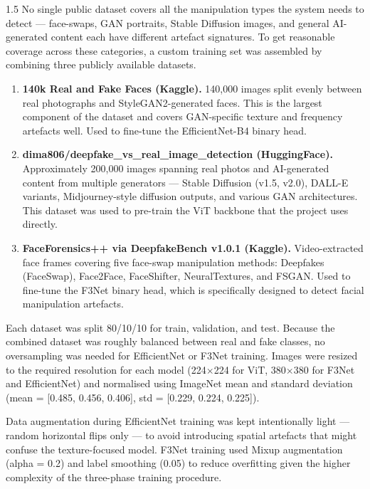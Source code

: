 \begin{spacing}{1.5}
No single public dataset covers all the manipulation types the system needs to detect --- face-swaps, GAN portraits, Stable Diffusion images, and general AI-generated content each have different artefact signatures. To get reasonable coverage across these categories, a custom training set was assembled by combining three publicly available datasets.

\begin{enumerate}
  \item \textbf{140k Real and Fake Faces (Kaggle).} 140,000 images split evenly between real photographs and StyleGAN2-generated faces. This is the largest component of the dataset and covers GAN-specific texture and frequency artefacts well. Used to fine-tune the EfficientNet-B4 binary head.

  \item \textbf{dima806/deepfake\_vs\_real\_image\_detection (HuggingFace).} Approximately 200,000 images spanning real photos and AI-generated content from multiple generators --- Stable Diffusion (v1.5, v2.0), DALL-E variants, Midjourney-style diffusion outputs, and various GAN architectures. This dataset was used to pre-train the ViT backbone that the project uses directly.

  \item \textbf{FaceForensics++ via DeepfakeBench v1.0.1 (Kaggle).} Video-extracted face frames covering five face-swap manipulation methods: Deepfakes (FaceSwap), Face2Face, FaceShifter, NeuralTextures, and FSGAN. Used to fine-tune the F3Net binary head, which is specifically designed to detect facial manipulation artefacts.
\end{enumerate}

Each dataset was split 80/10/10 for train, validation, and test. Because the combined dataset was roughly balanced between real and fake classes, no oversampling was needed for EfficientNet or F3Net training. Images were resized to the required resolution for each model (224$\times$224 for ViT, 380$\times$380 for F3Net and EfficientNet) and normalised using ImageNet mean and standard deviation (mean = [0.485, 0.456, 0.406], std = [0.229, 0.224, 0.225]).

Data augmentation during EfficientNet training was kept intentionally light --- random horizontal flips only --- to avoid introducing spatial artefacts that might confuse the texture-focused model. F3Net training used Mixup augmentation (alpha = 0.2) and label smoothing (0.05) to reduce overfitting given the higher complexity of the three-phase training procedure.
\end{spacing}


